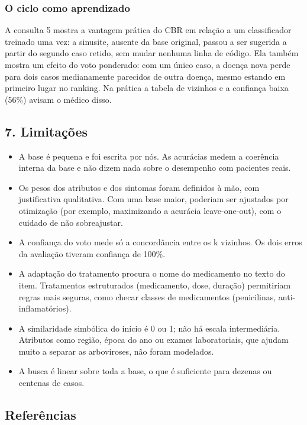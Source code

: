 \documentclass[12pt, a4paper]{article}
\providecommand{\tightlist}{%
  \setlength{\itemsep}{0pt}\setlength{\parskip}{0pt}}
\begin{document}
\subsubsection{O ciclo como aprendizado}\label{o-ciclo-como-aprendizado}

A consulta 5 mostra a vantagem prática do CBR em relação a um classificador treinado uma vez: a sinusite, ausente da base original, passou a ser sugerida a partir do segundo caso retido, sem mudar nenhuma linha de código. Ela também mostra um efeito do voto ponderado: com um único caso, a doença nova perde para dois casos medianamente parecidos de outra doença, mesmo estando em primeiro lugar no ranking. Na prática a tabela de vizinhos e a confiança baixa (56\%) avisam o médico disso.

\subsection{7. Limitações}\label{7-limitauxe7uxf5es}

\begin{itemize}
\tightlist
\item
  A base é pequena e foi escrita por nós. As acurácias medem a coerência interna da base e não dizem nada sobre o desempenho com pacientes reais.
\item
  Os pesos dos atributos e dos sintomas foram definidos à mão, com justificativa qualitativa. Com uma base maior, poderiam ser ajustados por otimização (por exemplo, maximizando a acurácia leave-one-out), com o cuidado de não sobreajustar.
\item
  A confiança do voto mede só a concordância entre os k vizinhos. Os dois erros da avaliação tiveram confiança de 100\%.
\item
  A adaptação do tratamento procura o nome do medicamento no texto do item. Tratamentos estruturados (medicamento, dose, duração) permitiriam regras mais seguras, como checar classes de medicamentos (penicilinas, anti-inflamatórios).
\item
  A similaridade simbólica do início é 0 ou 1; não há escala intermediária. Atributos como região, época do ano ou exames laboratoriais, que ajudam muito a separar as arboviroses, não foram modelados.
\item
  A busca é linear sobre toda a base, o que é suficiente para dezenas ou centenas de casos.
\end{itemize}

\subsection{Referências}\label{referuxeancias}
\end{document}
